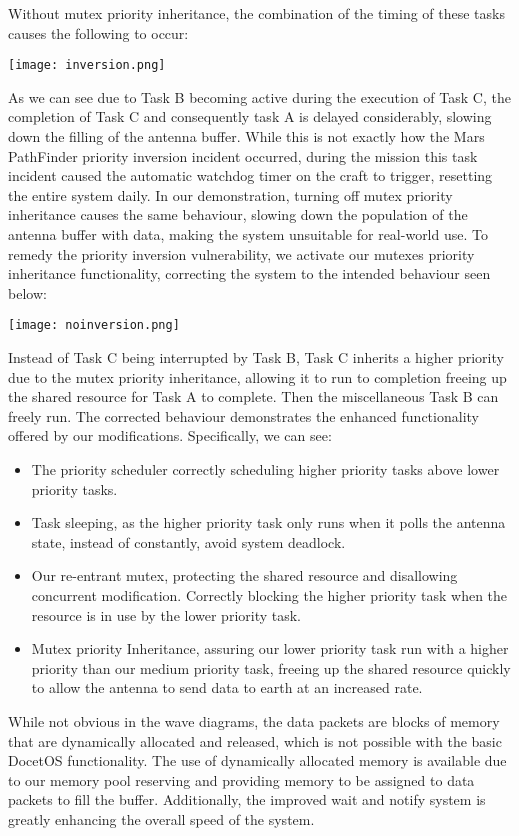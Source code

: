 \noindent
Without mutex priority inheritance, the combination of the timing of these tasks causes the following to occur: 
\begin{center}
	\texttt{[image: inversion.png]}
\end{center}
As we can see due to Task B becoming active during the execution of Task C, the completion of Task C and consequently task A is delayed considerably, slowing down the filling of the antenna buffer.  While this is not exactly how the Mars PathFinder priority inversion incident occurred, during the mission this task incident caused the automatic watchdog timer on the craft to trigger, resetting the entire system daily. In our demonstration, turning off mutex priority inheritance causes the same behaviour, slowing down the population of the antenna buffer with data, making the system unsuitable for real-world use.\hfill\newline
To remedy the priority inversion vulnerability, we activate our mutexes priority inheritance functionality, correcting the system to the intended behaviour seen below:
\begin{center}
	\texttt{[image: noinversion.png]}
\end{center}
Instead of Task C being interrupted by Task B, Task C inherits a higher priority due to the mutex priority inheritance, allowing it to run to completion freeing up the shared resource for Task A to complete. Then the miscellaneous Task B can freely run. The corrected behaviour demonstrates the enhanced functionality offered by our modifications. Specifically, we can see:
\begin{itemize}[]
	\item The priority scheduler correctly scheduling higher priority tasks above lower priority tasks.
	\item Task sleeping, as the higher priority task only runs when it polls the antenna state, instead of constantly, avoid system deadlock.
	\item Our re-entrant mutex, protecting the shared resource and disallowing concurrent modification. Correctly blocking the higher priority task when the resource is in use by the lower priority task.
	\item Mutex priority Inheritance, assuring our lower priority task run with a higher priority than our medium priority task, freeing up the shared resource quickly to allow the antenna to send data to earth at an increased rate.
\end{itemize}
While not obvious in the wave diagrams, the data packets are blocks of memory that are dynamically allocated and released, which is not possible with the basic DocetOS functionality. The use of dynamically allocated memory is available due to our memory pool reserving and providing memory to be assigned to data packets to fill the buffer. Additionally, the improved wait and notify system is greatly enhancing the overall speed of the system.